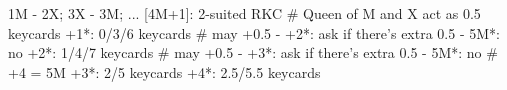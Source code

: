 1M - 2X; 3X - 3M; ... [4M+1]: 2-suited RKC
# Queen of M and X act as 0.5 keycards
+1*: 0/3/6 keycards  # may +0.5
   - +2*: ask if there's extra 0.5
        - 5M*: no
+2*: 1/4/7 keycards  # may +0.5
   - +3*: ask if there's extra 0.5
        - 5M*: no  # +4 = 5M
+3*: 2/5 keycards
+4*: 2.5/5.5 keycards